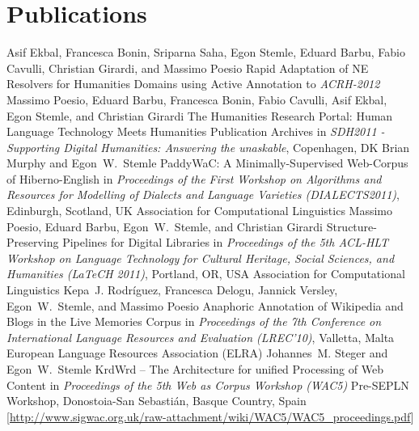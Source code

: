 \documentclass[11pt,a4paper]{moderncv}
\begin{document}
\section{Publications}
        {Asif Ekbal, Francesca Bonin, Sriparna Saha, Egon Stemle, Eduard Barbu,
        Fabio Cavulli, Christian Girardi, and Massimo Poesio}
        {\small Rapid Adaptation of NE Resolvers for Humanities Domains using
        Active Annotation}
        {\small to {\em ACRH-2012}}
        {}
        {}
        {Massimo Poesio, Eduard Barbu, Francesca Bonin, Fabio Cavulli, Asif
        Ekbal, Egon Stemle, and Christian Girardi}
        {\small The Humanities Research Portal: Human Language Technology Meets
        Humanities Publication Archives}
        {\small in {\em SDH2011 - Supporting Digital Humanities: Answering the
        unaskable}, Copenhagen, DK}
        {}
        {}
        {Brian Murphy and Egon~W.~Stemle}
        {\small PaddyWaC: A Minimally-Supervised Web-Corpus of Hiberno-English}
        {\small in {\em Proceedings of the First Workshop on Algorithms and
        Resources for Modelling of Dialects and Language Varieties
        (DIALECTS2011)}, Edinburgh, Scotland, UK}
        {\small Association for Computational Linguistics}
        {}
        {Massimo Poesio, Eduard Barbu, Egon~W.~Stemle, and Christian Girardi}
        {Structure-Preserving Pipelines for Digital Libraries}
        {\small in {\em Proceedings of the 5th ACL-HLT Workshop on Language
        Technology for Cultural Heritage, Social Sciences, and Humanities
        (LaTeCH 2011)}, Portland, OR, USA}
        {\small Association for Computational Linguistics}
        {}
        {Kepa~J. Rodr{\'i}guez, Francesca Delogu, Jannick Versley,
        Egon~W.~Stemle, and Massimo Poesio} {Anaphoric Annotation of Wikipedia
        and Blogs in the Live Memories Corpus}
        {\small in {\em Proceedings of the 7th Conference on International
        Language Resources and Evaluation (LREC'10)}, Valletta, Malta}
        {\small European Language Resources Association (ELRA)}
        {}
        {Johannes~M. Steger and Egon~W.~Stemle}
        {{KrdWrd} -- The Architecture for unified Processing of Web Content}
        {\small in {\em Proceedings of the 5th Web as Corpus Workshop (WAC5)}}
        {\small Pre-SEPLN Workshop, Donostoia-San Sebasti{\'a}n, Basque
        Country, Spain}
        {[\url{http://www.sigwac.org.uk/raw-attachment/wiki/WAC5/WAC5_proceedings.pdf}]}
\end{document}
